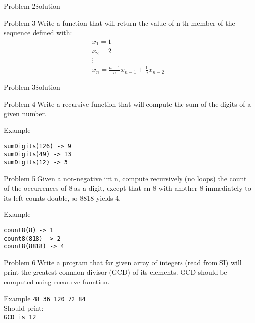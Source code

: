 \begin{frame}[fragile]{Problem 2}{Solution} 

\end{frame}

\begin{frame}{Problem 3}
Write a function that will return the value of n-th member of the sequence
defined with:
\[
   \begin{array}{l}
   x_1 = 1\\
   x_2 = 2\\ 
   \vdots\\
   x_n = \frac{n - 1}{n}x_{n - 1} + \frac{1}{n}x_{n - 2}
   \end{array}
\]
\end{frame}


\begin{frame}[fragile]{Problem 3}{Solution}

\end{frame}


\begin{frame}[fragile]{Problem 4}
Write a recursive function that will compute the sum of the digits of a
given number.
\begin{exampleblock}{Example}
\begin{verbatim}
sumDigits(126) -> 9
sumDigits(49) -> 13
sumDigits(12) -> 3
\end{verbatim}
\end{exampleblock}
\pause

\end{frame}

\begin{frame}[fragile]{Problem 5}
Given a non-negative int n, compute recursively (no loops) the count of the
occurrences of 8 as a digit, except that an 8 with another 8 immediately to its
left counts double, so 8818 yields 4.
\begin{exampleblock}{Example}
\begin{verbatim}
count8(8) -> 1
count8(818) -> 2
count8(8818) -> 4
\end{verbatim}
\end{exampleblock}
\pause

\end{frame}


\begin{frame}{Problem 6}
Write a program that for given array of integers (read from SI) will print the
greatest common divisor (GCD) of its elements. GCD should be computed using
recursive function.
\begin{exampleblock}{Example}
\texttt{48 36 120 72 84}\\
Should print:\\
\texttt{GCD is 12}
\end{exampleblock}
\end{frame}

